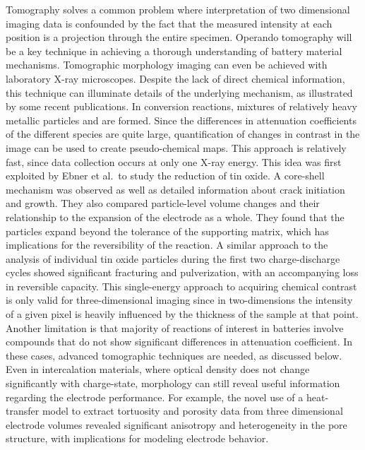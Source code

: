 \documentclass[journal=cmatex,manuscript=perspective]{achemso}
\begin{document}
Tomography solves a common problem where interpretation of two
dimensional imaging data is confounded by the fact that the measured
intensity at each position is a projection through the entire
specimen. Operando tomography will be a key technique in achieving a
thorough understanding of battery material mechanisms. Tomographic
morphology imaging can even be achieved with laboratory X-ray
microscopes\cite{shearing2014-2}. Despite the lack of direct chemical
information, this technique can illuminate details of the underlying
mechanism, as illustrated by some recent publications. In conversion
reactions, mixtures of relatively heavy metallic particles and
 are formed\cite{cabana2010-2}. Since the differences in
attenuation coefficients of the different species are quite large,
quantification of changes in contrast in the image can be used to
create pseudo-chemical maps. This approach is relatively fast, since
data collection occurs at only one X-ray energy. This idea was first
exploited by Ebner et al.\ to study the reduction of tin oxide. A
core-shell mechanism was observed as well as detailed information
about crack initiation and growth. They also compared particle-level
volume changes and their relationship to the expansion of the
electrode as a whole. They found that the particles expand beyond the
tolerance of the supporting matrix, which has implications for the
reversibility of the reaction\cite{ebner2013}. A similar approach to
the analysis of individual tin oxide particles during the first two
charge-discharge cycles showed significant fracturing and
pulverization, with an accompanying loss in reversible
capacity\cite{wang2014-2}. This single-energy approach to acquiring
chemical contrast is only valid for three-dimensional imaging since in
two-dimensions the intensity of a given pixel is heavily influenced by
the thickness of the sample at that point. Another limitation is that
majority of reactions of interest in batteries involve compounds that
do not show significant differences in attenuation coefficient. In
these cases, advanced tomographic techniques are needed, as discussed
below. Even in intercalation materials, where optical density does not
change significantly with charge-state, morphology can still reveal
useful information regarding the electrode performance. For example,
the novel use of a heat-transfer model to extract tortuosity and
porosity data from three dimensional electrode volumes revealed
significant anisotropy and heterogeneity in the pore structure, with
implications for modeling electrode behavior\cite{shearing2014}.
\end{document}
